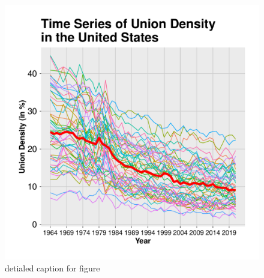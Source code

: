\documentclass[11pt]{article}\usepackage[]{graphicx}\usepackage[]{xcolor}
\newenvironment{knitrout}{}{} %
\begin{document}
\clearpage
\begin{figure}[h]
\centering
  \begin{minipage}{.8\linewidth}
\begin{knitrout}
\color{fgcolor}

{\centering \includegraphics[width=.8\linewidth]{figure/TimesSeriesUnitedStates-1} 

}


\end{knitrout}
  \caption{detialed caption for figure } 
  \label{fig:usstatesuniondensity}
  \end{minipage}
\end{figure}
\end{document}

